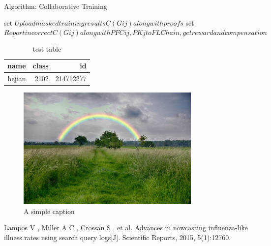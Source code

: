 \documentclass[conference]{IEEEtran}
\begin{document}
\begin{algorithm}
\caption{Algorithm: Collaborative Training}
\label{alg:A}
\begin{algorithmic}
\REPEAT 
\STATE set $ Upload masked training results C(Gij ) along with proofs$ 
\REPEAT
\STATE set $Report incorrect C(Gij ) along with PFCij ,PKj to
FLChain, get reward and compensation$ 
\end{algorithmic}
\end{algorithm}













\begin{table}
\centering
\caption{test table}
\begin{tabular}{|r|r|r|}
\hline
name & class & id \\
\hline
hejian & 2102 & 214712277 \\
\hline
\end{tabular}

\end{table}

\begin{figure}[ht!]
\centering
\includegraphics[width=90mm]{234.jpg}
\caption{A simple caption \label{figure-sample}}

\end{figure}


\begin{thebibliography}{00}
  Lampos V , Miller A C , Crossan S , et al. Advances in nowcasting
influenza-like illness rates using search query logs[J]. Scientific Reports,
2015, 5(1):12760.
\end{thebibliography}
\end{document}

